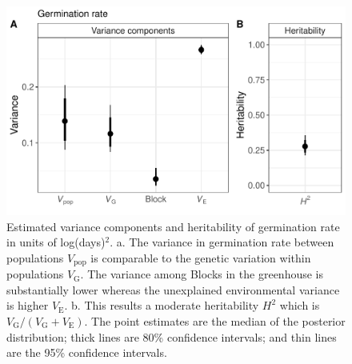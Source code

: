 \documentclass[
  12pt,
]{article}
\begin{document}
\begin{figure}[ht]
  \includegraphics[width=\textwidth]{figures/h2-germ.pdf}
  \caption{Estimated variance components and heritability of germination rate in units of log(days)$^2$. a. The variance in germination rate between populations $V_\text{pop}$ is comparable to the genetic variation within populations $V_\text{G}$. The variance among Blocks in the greenhouse is substantially lower whereas the unexplained environmental variance is higher $V_\text{E}$. b. This results a moderate heritability $H^2$ which is $V_\text{G} / (V_\text{G} + V_\text{E})$. The point estimates are the median of the posterior distribution; thick lines are 80\% confidence intervals; and thin lines are the 95\% confidence intervals.}
  \label{fig:h2-germ}
\end{figure}
\end{document}

